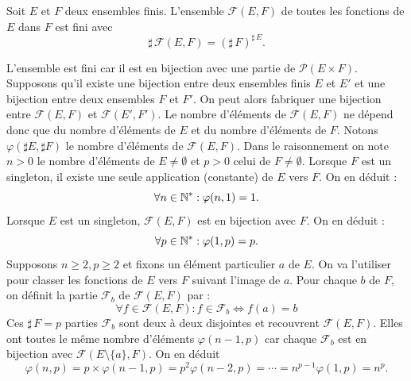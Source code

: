 \begin{propn}
 Soit $E$ et $F$ deux ensembles finis. L'ensemble $\mathcal F(E,F)$ de toutes les fonctions de $E$ dans $F$ est fini avec
\begin{displaymath}
 \sharp\,\mathcal F(E,F) = (\sharp \, F)^{\sharp\, E}.
\end{displaymath}
\end{propn}

\begin{demo}
 L'ensemble est fini car il est en bijection avec une partie de $\mathcal P(E\times F)$.\newline
Supposons qu'il existe une bijection entre deux ensembles finis $E$ et $E'$ et une bijection entre deux ensembles $F$ et $F'$. On peut alors fabriquer une bijection entre $\mathcal{F}(E,F)$ et $\mathcal{F}(E',F')$. Le nombre d'éléments de $\mathcal{F}(E,F)$ ne dépend donc que du nombre d'éléments de $E$ et du nombre d'éléments de $F$.\newline
Notons $\varphi(\sharp E, \sharp F)$ le nombre d'éléments de $\mathcal{F}(E,F)$. Dans le raisonnement on note $n > 0$ le nombre d'éléments de $E\neq\emptyset$ et $p > 0$ celui de $F\neq\emptyset$.\newline
Lorsque $F$ est un singleton, il existe une seule application (constante) de $E$ vers $F$. On en déduit :
\begin{displaymath}
 \forall n\in\mathbb{N}^* : \varphi(n,1) = 1.
\end{displaymath}
Lorsque $E$ est un singleton, $\mathcal{F}(E,F)$ est en bijection avec $F$. On en déduit :  
\begin{displaymath}
 \forall p\in\mathbb{N}^* : \varphi(1,p) = p.
\end{displaymath}
Supposons $n\geq 2 , p\geq2$ et fixons un élément particulier $a$ de $E$. On va l'utiliser pour classer les fonctions de $E$ vers $F$ suivant l'image de $a$.\newline
Pour chaque $b$ de $F$, on définit la partie $\mathcal{F}_b$ de $\mathcal{F}(E,F)$ par :
\begin{displaymath}
 \forall f\in \mathcal{F}(E,F) : f\in \mathcal{F}_b \Leftrightarrow f(a) = b
\end{displaymath}
Ces $\sharp\, F = p$ parties $\mathcal{F}_b$ sont deux à deux disjointes et recouvrent $\mathcal{F}(E,F)$.\newline
Elles ont toutes le même nombre d'éléments $\varphi(n-1,p)$ car chaque $\mathcal{F}_b$ est en bijection avec $\mathcal{F}(E\setminus\{a\},F)$.\newline
On en déduit
\begin{displaymath}
 \varphi(n,p) = p \times\varphi(n-1,p) = p^2\varphi(n-2,p) = \cdots = n^{p-1}\varphi(1,p) = n^p.
\end{displaymath}
\end{demo}
